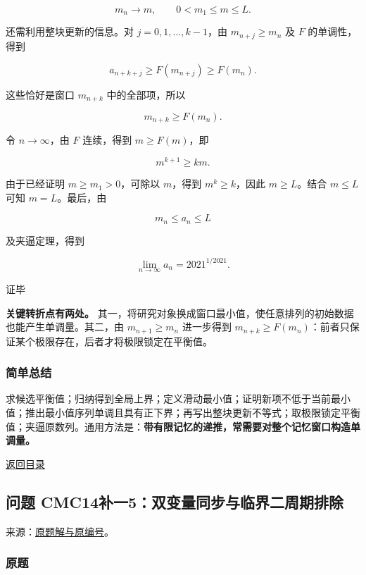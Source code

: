 \documentclass[11pt,a4paper]{article}
\begin{document}
\[
m_n\longrightarrow m,\qquad 0<m_1\le m\le L.
\]

还需利用整块更新的信息。对 \(j=0,1,\ldots,k-1\)，由 \(m_{n+j}\ge m_n\)
及 \(F\) 的单调性，得到

\[
a_{n+k+j}\ge F(m_{n+j})\ge F(m_n).
\]

这些恰好是窗口 \(m_{n+k}\) 中的全部项，所以

\[
m_{n+k}\ge F(m_n).
\]

令 \(n\to\infty\)，由 \(F\) 连续，得到 \(m\ge F(m)\)，即

\[
m^{k+1}\ge km.
\]

由于已经证明 \(m\ge m_1>0\)，可除以 \(m\)，得到 \(m^k\ge k\)，因此
\(m\ge L\)。结合 \(m\le L\) 可知 \(m=L\)。最后，由

\[
m_n\le a_n\le L
\]

及夹逼定理，得到

\[
\boxed{\displaystyle\lim_{n\to\infty}a_n=2021^{1/2021}.}
\]

证毕

\textbf{关键转折点有两处。}
其一，将研究对象换成窗口最小值，使任意排列的初始数据也能产生单调量。其二，由
\(m_{n+1}\ge m_n\) 进一步得到
\(m_{n+k}\ge F(m_n)\)：前者只保证某个极限存在，后者才将极限锁定在平衡值。

\subsubsection{简单总结}\label{ux7b80ux5355ux603bux7ed3-18}

求候选平衡值；归纳得到全局上界；定义滑动最小值；证明新项不低于当前最小值；推出最小值序列单调且具有正下界；再写出整块更新不等式；取极限锁定平衡值；夹逼原数列。通用方法是：\textbf{带有限记忆的递推，常需要对整个记忆窗口构造单调量。}

\noindent\hyperref[contents]{返回目录}

\subsection{问题
CMC14补一5：双变量同步与临界二周期排除}\label{ux95eeux9898-cmc14ux8865ux4e005ux53ccux53d8ux91cfux540cux6b65ux4e0eux4e34ux754cux4e8cux5468ux671fux6392ux9664}

来源：\href{https://zj139.github.io/math-notes/essays/ac24766aa5d8ff02f8d5946b/\#问题-5}{原题解与原编号}。

\subsubsection{原题}\label{ux539fux9898-19}
\end{document}
